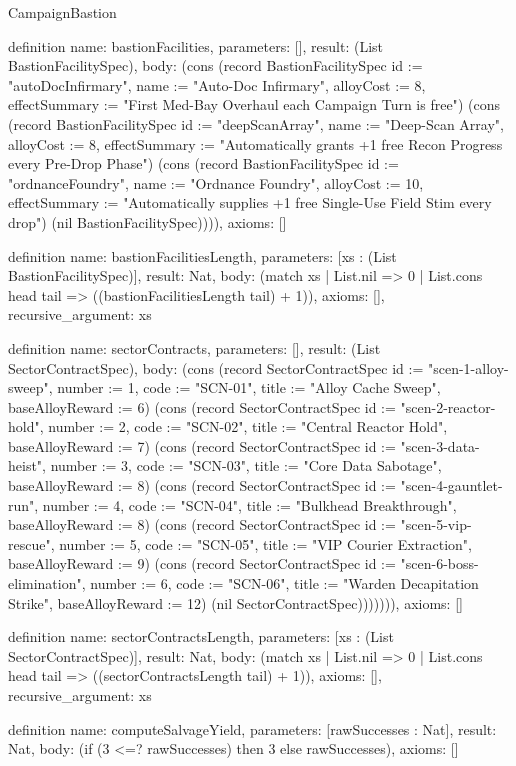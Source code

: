 \begin{lexlean}{CampaignBastion}
\begin{semanticmodule}
definition{
  name: bastionFacilities,
  parameters: [],
  result: (List BastionFacilitySpec),
  body: (cons (record BastionFacilitySpec {id := "autoDocInfirmary", name := "Auto-Doc Infirmary", alloyCost := 8, effectSummary := "First Med-Bay Overhaul each Campaign Turn is free"}) (cons (record BastionFacilitySpec {id := "deepScanArray", name := "Deep-Scan Array", alloyCost := 8, effectSummary := "Automatically grants +1 free Recon Progress every Pre-Drop Phase"}) (cons (record BastionFacilitySpec {id := "ordnanceFoundry", name := "Ordnance Foundry", alloyCost := 10, effectSummary := "Automatically supplies +1 free Single-Use Field Stim every drop"}) (nil BastionFacilitySpec)))),
  axioms: []
}

definition{
  name: bastionFacilitiesLength,
  parameters: [xs : (List BastionFacilitySpec)],
  result: Nat,
  body: (match xs
    | List.nil => 0
    | List.cons head tail => ((bastionFacilitiesLength tail) + 1)),
  axioms: [],
  recursive_argument: xs
}

definition{
  name: sectorContracts,
  parameters: [],
  result: (List SectorContractSpec),
  body: (cons (record SectorContractSpec {id := "scen-1-alloy-sweep", number := 1, code := "SCN-01", title := "Alloy Cache Sweep", baseAlloyReward := 6}) (cons (record SectorContractSpec {id := "scen-2-reactor-hold", number := 2, code := "SCN-02", title := "Central Reactor Hold", baseAlloyReward := 7}) (cons (record SectorContractSpec {id := "scen-3-data-heist", number := 3, code := "SCN-03", title := "Core Data Sabotage", baseAlloyReward := 8}) (cons (record SectorContractSpec {id := "scen-4-gauntlet-run", number := 4, code := "SCN-04", title := "Bulkhead Breakthrough", baseAlloyReward := 8}) (cons (record SectorContractSpec {id := "scen-5-vip-rescue", number := 5, code := "SCN-05", title := "VIP Courier Extraction", baseAlloyReward := 9}) (cons (record SectorContractSpec {id := "scen-6-boss-elimination", number := 6, code := "SCN-06", title := "Warden Decapitation Strike", baseAlloyReward := 12}) (nil SectorContractSpec))))))),
  axioms: []
}

definition{
  name: sectorContractsLength,
  parameters: [xs : (List SectorContractSpec)],
  result: Nat,
  body: (match xs
    | List.nil => 0
    | List.cons head tail => ((sectorContractsLength tail) + 1)),
  axioms: [],
  recursive_argument: xs
}

definition{
  name: computeSalvageYield,
  parameters: [rawSuccesses : Nat],
  result: Nat,
  body: (if (3 <=? rawSuccesses) then 3 else rawSuccesses),
  axioms: []
}


\end{semanticmodule}
\end{lexlean}
